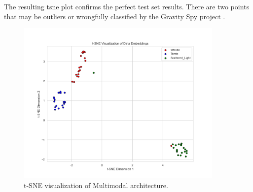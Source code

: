 The resulting \acrshort{tsne} plot confirms the perfect test set results. There are two points that may be outliers or wrongfully classified by the Gravity Spy project \citep{zevin2017gravity}. 

\begin{figure}[H]
    \centering
    \includegraphics[width=0.9\textwidth]{Grad Assignment/Images/tSNE_RQ3_ImageModel_test.png}
    \caption{t-SNE visualization of Multimodal architecture.}
    \label{fig:tsne_multimodal}
\end{figure}
